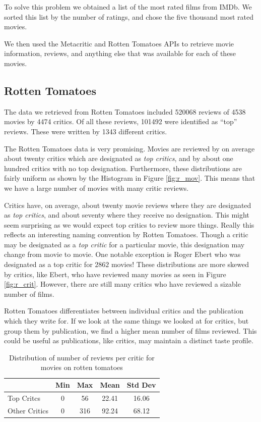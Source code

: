 \documentclass[12pt]{article}
\begin{document}
	To solve this problem we obtained a list of the most rated films from IMDb. We sorted this list by the number of ratings, and chose the five thousand most rated movies. 

	We then used the Metacritic and Rotten Tomatoes APIs to retrieve movie information, reviews, and anything else that was available for each of these movies.

\subsection{Rotten Tomatoes}

	The data we retrieved from Rotten Tomatoes included 520068 reviews of 4538 movies by 4474 critics. Of all these reviews, 101492 were identified as ``top'' reviews. These were written by 1343 different critics.

	The Rotten Tomatoes data is very promising. Movies are reviewed by on average about twenty critics which are designated as \textit{top critics}, and by about one hundred critics with no top designation. Furthermore, these distributions are fairly uniform as shown by the Histogram in Figure \ref{fig:r_mov}. This means that we have a large number of movies with many critic reviews.

	Critics have, on average, about twenty movie reviews where they are designated as \textit{top critics}, and about seventy where they receive no designation. This might seem surprising as we would expect top critics to review more things. Really this reflects an interesting naming convention by Rotten Tomatoes. Though a critic may be designated as a \textit{top critic} for a particular movie, this designation may change from movie to movie. One notable exception is Roger Ebert who was designated as a top critic for $2862$ movies! These distributions are more skewed by critics, like Ebert, who have reviewed many movies as seen in Figure \ref{fig:r_crit}. However, there are still many critics who have reviewed a sizable number of films.

	Rotten Tomatoes differentiates between individual critics and the publication which they write for. If we look at the same things we looked at for critics, but group them by publication, we find a higher mean number of films reviewed. This could be useful as publications, like critics, may maintain a distinct taste profile.

	\begin{table}[H]
	 \centering
	 \caption{Distribution of number of reviews per critic for movies on rotten tomatoes}
	 \begin{tabular}{ l | c | c | c | c }
	 \hline
	 &  Min & Max & Mean & Std Dev  \\
	 \hline
	 Top Critcs & 0 & 56 & 22.41 & 16.06 \\
	 Other Critics & 0 & 316 & 92.24 & 68.12 \\
	 \hline
	 \end{tabular}
	 \end{table}
\end{document}
